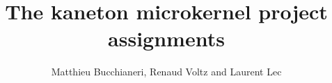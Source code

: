 
%
%

\def\path{../../../..}

%
%



%
%

\rhead{}

%
%

\title{The kaneton microkernel project assignments
       \logos}

%
%

\author{\small{Matthieu Bucchianeri}, \small{Renaud Voltz} and \small{Laurent Lec}}

%
%



%
%

\maketitle

%
%

\tableofcontents

%
%




